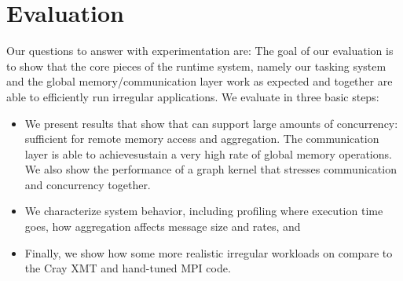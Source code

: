 \section{Evaluation}
\label{sec:evaluation}

Our questions to answer with experimentation are:
The goal of our evaluation is to show that the core pieces of the \Grappa
runtime system, namely our tasking system and the global memory/communication
layer work as expected and together are able to efficiently run irregular
applications. We evaluate \Grappa in three basic steps:

\begin{itemize}

\item We present results that show that \Grappa can
    support large amounts of concurrency: sufficient for remote memory
    access and aggregation. The communication layer is able to
    achievesustain a very high rate of global memory operations. We also show the performance of a
graph kernel that stresses communication and concurrency together.

\item We characterize system behavior, including
profiling where execution time goes, how aggregation affects message size and
rates, and 

\item Finally, we show how some more realistic irregular workloads on \Grappa
compare to the Cray XMT and hand-tuned MPI code.



\end{itemize}

